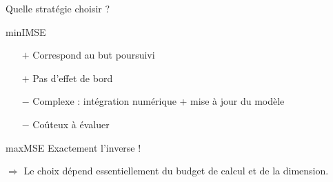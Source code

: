 \begin{frame}{Quelle stratégie choisir ?}
\begin{block}{minIMSE}
 \begin{itemize}
  \item[$+$] Correspond au but poursuivi
  \item[$+$] Pas d'effet de bord
  \item[$-$] Complexe : intégration numérique + mise à jour du modèle
  \item[$-$] Coûteux à évaluer  
 \end{itemize}
\end{block}

\begin{exampleblock}{maxMSE}
Exactement l'inverse !
\end{exampleblock}

$\Rightarrow$ Le choix dépend essentiellement du budget de calcul et de la dimension.

\end{frame}
